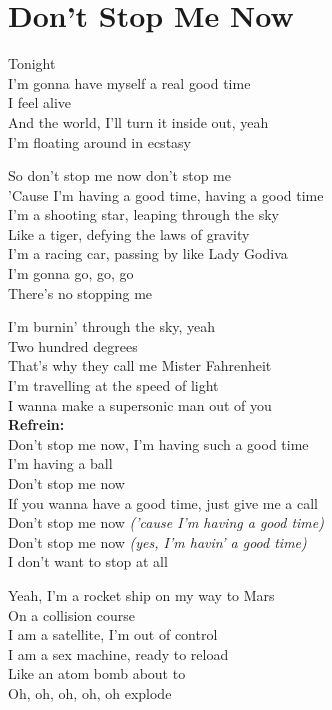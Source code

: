 \section{Don't Stop Me Now}
Tonight\\
I'm gonna have myself a real good time\\
I feel alive\\
And the world, I'll turn it inside out, yeah\\
I'm floating around in ecstasy

So don't stop me now don't stop me\\
'Cause I'm having a good time, having a good time\\

I'm a shooting star, leaping through the sky\\
Like a tiger, defying the laws of gravity\\
I'm a racing car, passing by like Lady Godiva\\
I'm gonna go, go, go\\
There's no stopping me

I'm burnin' through the sky, yeah\\
Two hundred degrees\\
That's why they call me Mister Fahrenheit\\
I'm travelling at the speed of light\\
I wanna make a supersonic man out of you\\

\textbf{Refrein:}\\
Don't stop me now, I'm having such a good time\\
I'm having a ball\\
Don't stop me now\\
If you wanna have a good time, just give me a call\\
Don't stop me now \textit{('cause I'm having a good time)}\\
Don't stop me now \textit{(yes, I'm havin' a good time)}\\
I don't want to stop at all

Yeah, I'm a rocket ship on my way to Mars\\
On a collision course\\
I am a satellite, I'm out of control\\
I am a sex machine, ready to reload\\
Like an atom bomb about to\\
Oh, oh, oh, oh, oh explode

